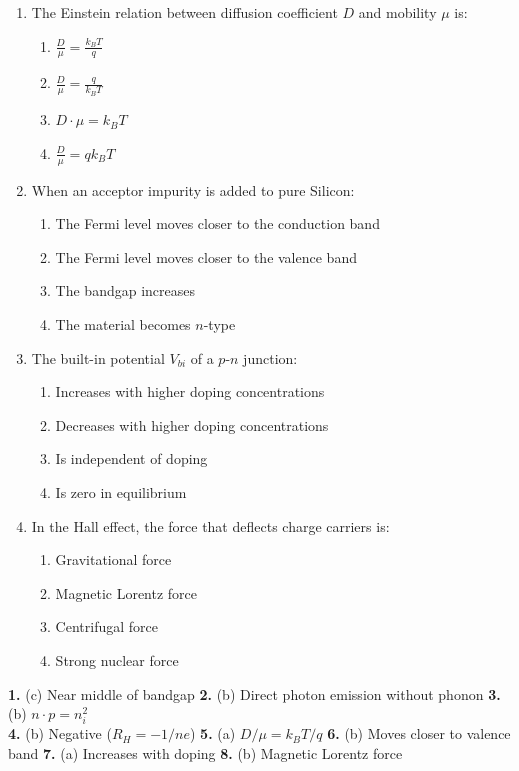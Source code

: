 \begin{enumerate}
    \item The Einstein relation between diffusion coefficient $D$ and mobility $\mu$ is:
    \begin{enumerate}
        \item $\frac{D}{\mu} = \frac{k_B T}{q}$
        \item $\frac{D}{\mu} = \frac{q}{k_B T}$
        \item $D \cdot \mu = k_B T$
        \item $\frac{D}{\mu} = q k_B T$
    \end{enumerate}
    
    \item When an acceptor impurity is added to pure Silicon:
    \begin{enumerate}
        \item The Fermi level moves closer to the conduction band
        \item The Fermi level moves closer to the valence band
        \item The bandgap increases
        \item The material becomes $n$-type
    \end{enumerate}
    
    \item The built-in potential $V_{bi}$ of a $p$-$n$ junction:
    \begin{enumerate}
        \item Increases with higher doping concentrations
        \item Decreases with higher doping concentrations
        \item Is independent of doping
        \item Is zero in equilibrium
    \end{enumerate}
    
    \item In the Hall effect, the force that deflects charge carriers is:
    \begin{enumerate}
        \item Gravitational force
        \item Magnetic Lorentz force
        \item Centrifugal force
        \item Strong nuclear force
    \end{enumerate}
\end{enumerate}

\begin{solutionbox}
\textbf{1.} (c) Near middle of bandgap \quad \textbar\quad
\textbf{2.} (b) Direct photon emission without phonon \quad \textbar\quad
\textbf{3.} (b) $n \cdot p = n_i^2$ \\
\textbf{4.} (b) Negative ($R_H = -1/ne$) \quad \textbar\quad
\textbf{5.} (a) $D/\mu = k_B T / q$ \quad \textbar\quad
\textbf{6.} (b) Moves closer to valence band \quad \textbar\quad
\textbf{7.} (a) Increases with doping \quad \textbar\quad
\textbf{8.} (b) Magnetic Lorentz force
\end{solutionbox}

